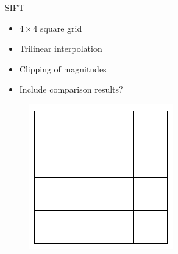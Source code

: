 \documentclass[14pt,t]{beamer}
\begin{document}
%
\begin{frame}{SIFT \cite{lowe2004distinctive}}
\begin{minipage}[t]{0.7\textwidth}
	\begin{itemize}
	\item $4 \times 4$ square grid
	\item Trilinear interpolation
	\item Clipping of magnitudes
	\item Include comparison results?
	\end{itemize}
\end{minipage}
\begin{minipage}[t]{0.25\textwidth}
	\begin{figure}
		\includegraphics[width=\textwidth]{../report/img/siftGrid.pdf}
	\end{figure}
\end{minipage}
\end{frame}
%
\end{document}
